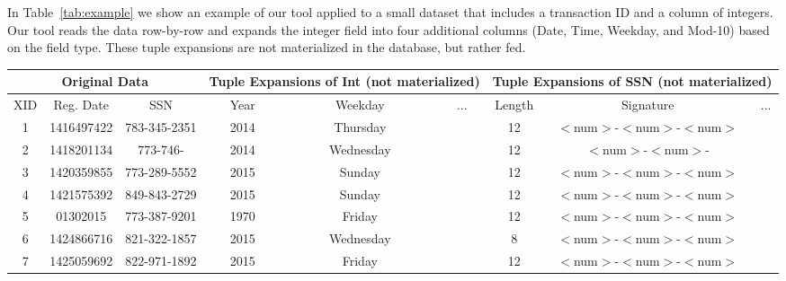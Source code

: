 In Table~\ref{tab:example} we show an example of our tool applied to a small dataset that includes a transaction ID and a column of integers.
Our tool reads the data row-by-row and expands the integer field into four additional columns (Date, Time, Weekday, and Mod-10) based on the field type.
These tuple expansions are not materialized in the database, but rather fed. 

\begin{table*}[t]
\centering
\begin{tabular}{|c|c|c||c|c|c|c|c|c|}
\multicolumn{3}{c}{Original Data} & \multicolumn{3}{c}{Tuple Expansions of Int (not materialized)} & \multicolumn{3}{c}{Tuple Expansions of SSN (not materialized)} \\
\hline
XID & Reg. Date & SSN & Year & Weekday & ... & Length & Signature & ... \\ \hline
1 & 1416497422 & 783-345-2351 & 2014 & Thursday && 12 & $<$num$>$-$<$num$>$-$<$num$>$ &  \\ \hline 
\rowcolor{red} 
2 & 1418201134 & 773-746- & 2014  & Wednesday && 12 & $<$num$>$-$<$num$>$- &  \\ \hline 
3 & 1420359855 & 773-289-5552 & 2015  & Sunday && 12 & $<$num$>$-$<$num$>$-$<$num$>$ &  \\ \hline 
4 & 1421575392 & 849-843-2729 & 2015 & Sunday && 12 & $<$num$>$-$<$num$>$-$<$num$>$ &  \\ \hline 
\rowcolor{red} 
5 & 01302015 & 773-387-9201 & 1970 & Friday && 12 & $<$num$>$-$<$num$>$-$<$num$>$ &  \\ \hline 
6 & 1424866716 & 821-322-1857 & 2015 & Wednesday && 8 & $<$num$>$-$<$num$>$-$<$num$>$ &  \\ \hline 
7 & 1425059692 & 822-971-1892 & 2015 & Friday && 12 & $<$num$>$-$<$num$>$-$<$num$>$ &  \\ \hline 
\end{tabular}
\caption{An example dataset showing an outlier detected by a histogram model}
\label{tab:example}
\end{table*}
